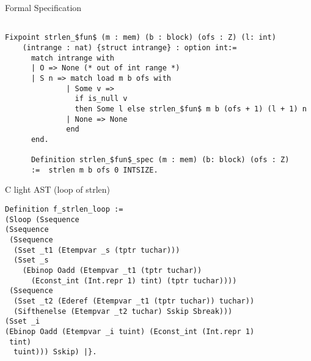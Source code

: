 \documentclass{beamer}
\begin{document}
\begin{frame}[fragile]{Formal Specification}

 
  \begin{lstlisting}[language=Coq]
    
Fixpoint strlen_$fun$ (m : mem) (b : block) (ofs : Z) (l: int)
    (intrange : nat) {struct intrange} : option int:= 
      match intrange with
      | O => None (* out of int range *)
      | S n => match load m b ofs with 
              | Some v =>
                if is_null v
                then Some l else strlen_$fun$ m b (ofs + 1) (l + 1) n  
              | None => None 
              end
      end.

      Definition strlen_$fun$_spec (m : mem) (b: block) (ofs : Z)
      :=  strlen m b ofs 0 INTSIZE.
                    \end{lstlisting}
                    

      
                    
\end{frame}


\begin{frame}[fragile]{C light AST (loop of strlen)}

\begin{lstlisting}[language=Coq]
Definition f_strlen_loop := 
(Sloop (Ssequence
(Ssequence
 (Ssequence
  (Sset _t1 (Etempvar _s (tptr tuchar)))
  (Sset _s
    (Ebinop Oadd (Etempvar _t1 (tptr tuchar))
      (Econst_int (Int.repr 1) tint) (tptr tuchar))))
 (Ssequence
  (Sset _t2 (Ederef (Etempvar _t1 (tptr tuchar)) tuchar))
  (Sifthenelse (Etempvar _t2 tuchar) Sskip Sbreak)))
(Sset _i
(Ebinop Oadd (Etempvar _i tuint) (Econst_int (Int.repr 1)
 tint)
  tuint))) Sskip) |}.

\end{lstlisting}

\end{frame}
\end{document}
